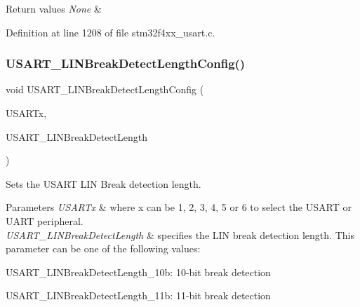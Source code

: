 \begin{DoxyRetVals}{Return values}
{\em None} & \\
\hline
\end{DoxyRetVals}


Definition at line 1208 of file stm32f4xx\+\_\+usart.\+c.

\mbox{\label{group___u_s_a_r_t_ga7bc2d291831cbc5e53e73337308029b5}} 
\subsubsection{\texorpdfstring{U\+S\+A\+R\+T\+\_\+\+L\+I\+N\+Break\+Detect\+Length\+Config()}{USART\_LINBreakDetectLengthConfig()}}
{\footnotesize\ttfamily void U\+S\+A\+R\+T\+\_\+\+L\+I\+N\+Break\+Detect\+Length\+Config (\begin{DoxyParamCaption}\item[{\hyperlink{struct_u_s_a_r_t___type_def}{U\+S\+A\+R\+T\+\_\+\+Type\+Def} $\ast$}]{U\+S\+A\+R\+Tx,  }\item[{uint16\+\_\+t}]{U\+S\+A\+R\+T\+\_\+\+L\+I\+N\+Break\+Detect\+Length }\end{DoxyParamCaption})}



Sets the U\+S\+A\+RT L\+IN Break detection length. 


\begin{DoxyParams}{Parameters}
{\em U\+S\+A\+R\+Tx} & where x can be 1, 2, 3, 4, 5 or 6 to select the U\+S\+A\+RT or U\+A\+RT peripheral. \\
\hline
{\em U\+S\+A\+R\+T\+\_\+\+L\+I\+N\+Break\+Detect\+Length} & specifies the L\+IN break detection length. This parameter can be one of the following values\+: \begin{DoxyItemize}
\item U\+S\+A\+R\+T\+\_\+\+L\+I\+N\+Break\+Detect\+Length\+\_\+10b\+: 10-\/bit break detection \item U\+S\+A\+R\+T\+\_\+\+L\+I\+N\+Break\+Detect\+Length\+\_\+11b\+: 11-\/bit break detection \end{DoxyItemize}
\\
\hline
\end{DoxyParams}

